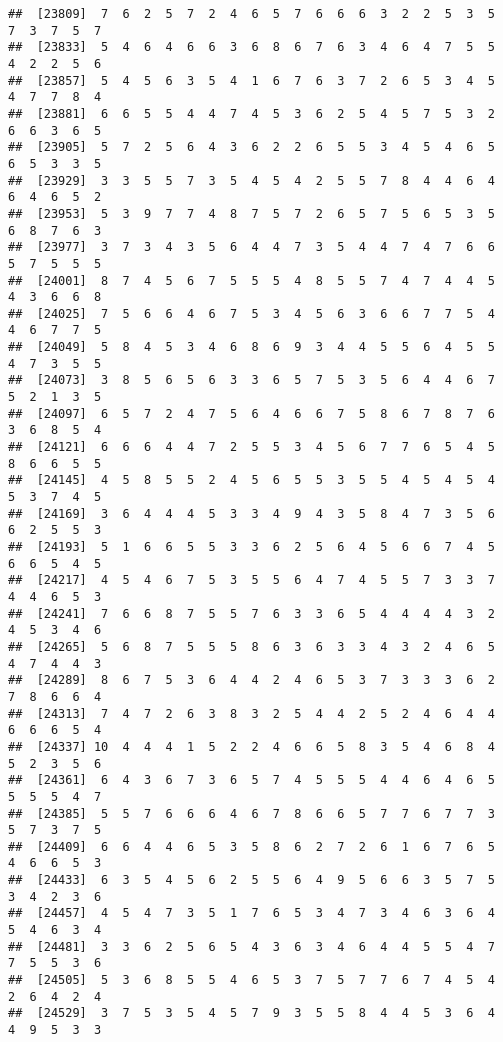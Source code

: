 \documentclass[
]{book}
\begin{document}
\begin{verbatim}
##  [23809]  7  6  2  5  7  2  4  6  5  7  6  6  6  3  2  2  5  3  5  7  3  7  5  7
##  [23833]  5  4  6  4  6  6  3  6  8  6  7  6  3  4  6  4  7  5  5  4  2  2  5  6
##  [23857]  5  4  5  6  3  5  4  1  6  7  6  3  7  2  6  5  3  4  5  4  7  7  8  4
##  [23881]  6  6  5  5  4  4  7  4  5  3  6  2  5  4  5  7  5  3  2  6  6  3  6  5
##  [23905]  5  7  2  5  6  4  3  6  2  2  6  5  5  3  4  5  4  6  5  6  5  3  3  5
##  [23929]  3  3  5  5  7  3  5  4  5  4  2  5  5  7  8  4  4  6  4  6  4  6  5  2
##  [23953]  5  3  9  7  7  4  8  7  5  7  2  6  5  7  5  6  5  3  5  6  8  7  6  3
##  [23977]  3  7  3  4  3  5  6  4  4  7  3  5  4  4  7  4  7  6  6  5  7  5  5  5
##  [24001]  8  7  4  5  6  7  5  5  5  4  8  5  5  7  4  7  4  4  5  4  3  6  6  8
##  [24025]  7  5  6  6  4  6  7  5  3  4  5  6  3  6  6  7  7  5  4  4  6  7  7  5
##  [24049]  5  8  4  5  3  4  6  8  6  9  3  4  4  5  5  6  4  5  5  4  7  3  5  5
##  [24073]  3  8  5  6  5  6  3  3  6  5  7  5  3  5  6  4  4  6  7  5  2  1  3  5
##  [24097]  6  5  7  2  4  7  5  6  4  6  6  7  5  8  6  7  8  7  6  3  6  8  5  4
##  [24121]  6  6  6  4  4  7  2  5  5  3  4  5  6  7  7  6  5  4  5  8  6  6  5  5
##  [24145]  4  5  8  5  5  2  4  5  6  5  5  3  5  5  4  5  4  5  4  5  3  7  4  5
##  [24169]  3  6  4  4  4  5  3  3  4  9  4  3  5  8  4  7  3  5  6  6  2  5  5  3
##  [24193]  5  1  6  6  5  5  3  3  6  2  5  6  4  5  6  6  7  4  5  6  6  5  4  5
##  [24217]  4  5  4  6  7  5  3  5  5  6  4  7  4  5  5  7  3  3  7  4  4  6  5  3
##  [24241]  7  6  6  8  7  5  5  7  6  3  3  6  5  4  4  4  4  3  2  4  5  3  4  6
##  [24265]  5  6  8  7  5  5  5  8  6  3  6  3  3  4  3  2  4  6  5  4  7  4  4  3
##  [24289]  8  6  7  5  3  6  4  4  2  4  6  5  3  7  3  3  3  6  2  7  8  6  6  4
##  [24313]  7  4  7  2  6  3  8  3  2  5  4  4  2  5  2  4  6  4  4  6  6  6  5  4
##  [24337] 10  4  4  4  1  5  2  2  4  6  6  5  8  3  5  4  6  8  4  5  2  3  5  6
##  [24361]  6  4  3  6  7  3  6  5  7  4  5  5  5  4  4  6  4  6  5  5  5  5  4  7
##  [24385]  5  5  7  6  6  6  4  6  7  8  6  6  5  7  7  6  7  7  3  5  7  3  7  5
##  [24409]  6  6  4  4  6  5  3  5  8  6  2  7  2  6  1  6  7  6  5  4  6  6  5  3
##  [24433]  6  3  5  4  5  6  2  5  5  6  4  9  5  6  6  3  5  7  5  3  4  2  3  6
##  [24457]  4  5  4  7  3  5  1  7  6  5  3  4  7  3  4  6  3  6  4  5  4  6  3  4
##  [24481]  3  3  6  2  5  6  5  4  3  6  3  4  6  4  4  5  5  4  7  7  5  5  3  6
##  [24505]  5  3  6  8  5  5  4  6  5  3  7  5  7  7  6  7  4  5  4  2  6  4  2  4
##  [24529]  3  7  5  3  5  4  5  7  9  3  5  5  8  4  4  5  3  6  4  4  9  5  3  3

\end{verbatim}
\end{document}
